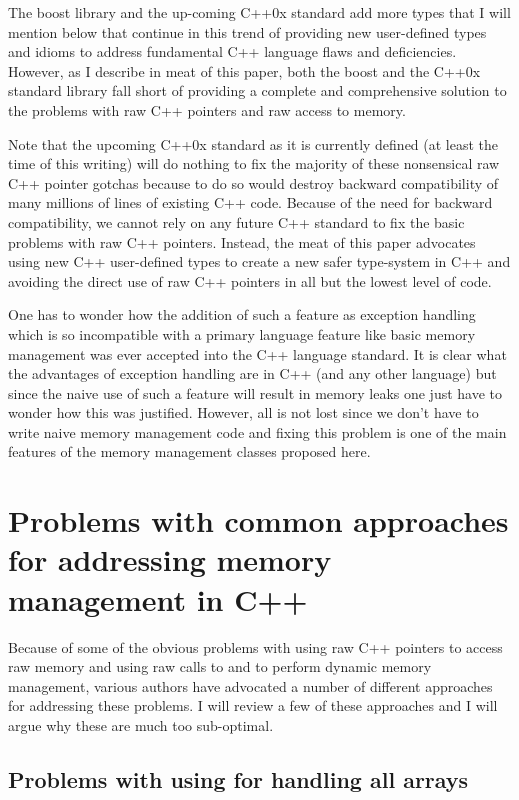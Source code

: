 \documentclass[pdf,ps2pdf,11pt]{SANDreport}
\begin{document}
The boost library and the up-coming C++0x standard add more types that
I will mention below that continue in this trend of providing new
user-defined types and idioms to address fundamental C++ language
flaws and deficiencies.  However, as I describe in meat of this paper,
both the boost and the C++0x standard library fall short of providing
a complete and comprehensive solution to the problems with raw C++
pointers and raw access to memory.

Note that the upcoming C++0x standard as it is currently defined (at
least the time of this writing) will do nothing to fix the majority of
these nonsensical raw C++ pointer gotchas because to do so would
destroy backward compatibility of many millions of lines of existing
C++ code.  Because of the need for backward compatibility, we cannot
rely on any future C++ standard to fix the basic problems with raw C++
pointers.  Instead, the meat of this paper advocates using new C++
user-defined types to create a new safer type-system in C++ and
avoiding the direct use of raw C++ pointers in all but the lowest
level of code.

One has to wonder how the addition of such a feature as exception
handling which is so incompatible with a primary language feature like
basic memory management was ever accepted into the C++ language
standard.  It is clear what the advantages of exception handling are
in C++ (and any other language) but since the naive use of such a
feature will result in memory leaks one just have to wonder how this
was justified.  However, all is not lost since we don't have to write
naive memory management code and fixing this problem is one of the
main features of the memory management classes proposed here.


%
{}\section{Problems with common approaches for addressing memory
management in C++}
\label{sec:current-appraoches-to-mem-mng}
%

Because of some of the obvious problems with using raw C++ pointers to
access raw memory and using raw calls to {} and
{} to perform dynamic memory management, various authors
have advocated a number of different approaches for addressing these
problems.  I will review a few of these approaches and I will argue
why these are much too sub-optimal.


%
{}\subsection{Problems with using {} for handling
all arrays}
%
\end{document}

